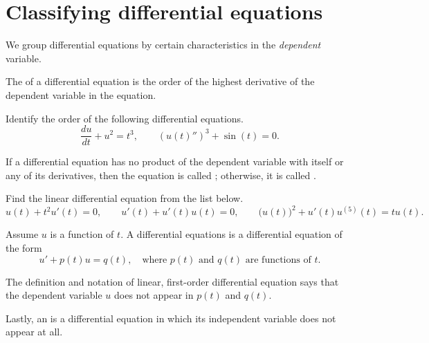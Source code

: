 \documentclass[../main.tex]{subfiles}
\begin{document}
 \section{Classifying differential equations}

We group differential equations by certain characteristics in the \emph{dependent} variable.

\begin{definition}[order]
The  of a differential equation is the order of the highest derivative of the dependent variable in the equation.
\end{definition}
\begin{example}
  Identify the order of the following differential equations.
  \[
    \frac{du}{dt} + u^{2} = t^{3}, 
    \qquad
    \left(u(t)''\right)^{3} + \sin(t) = 0.
  \]
\end{example}

\begin{definition}
  If a differential equation has no product of the dependent variable with itself or any of its derivatives, then the equation is called ; otherwise, it is called . 
\end{definition}
\begin{example}
  Find the linear differential equation from the list below.
  \[
    u(t) + t^{2} u'(t) = 0,
    \qquad
    u'(t) + u'(t) u(t) = 0,
    \qquad
    \big(u(t)\big)^{2} + u'(t) u^{(5)}(t) = t u(t).
  \]
\end{example}

\begin{definition}
  Assume \(u\) is a function of \(t\). A  differential equations is a differential equation of the form
  \[
    u' + p(t) u = q(t), \quad\text{where \(p(t)\) and \(q(t)\) are functions of \(t\)}.
  \]
\end{definition}

\faExclamationTriangle{} The definition and notation of linear, first-order differential equation says that the dependent variable \(u\) does not appear in \(p(t)\) and \(q(t)\).

Lastly, an  is a differential equation in which its independent variable does not appear at all. 
\end{document}

